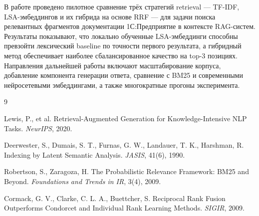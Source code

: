 \documentclass[nonacm, sigconf]{acmart}
\begin{document}
В работе проведено пилотное сравнение трёх стратегий retrieval — TF-IDF, LSA-эмбеддингов и их гибрида на основе RRF — для задачи поиска релевантных фрагментов документации 1С:Предприятие в контексте RAG-систем. Результаты показывают, что локально обученные LSA-эмбеддинги способны превзойти лексический baseline по точности первого результата, а гибридный метод обеспечивает наиболее сбалансированное качество на top-3 позициях. Направления дальнейшей работы включают масштабирование корпуса, добавление компонента генерации ответа, сравнение с BM25 и современными нейросетевыми эмбеддингами, а также многократные прогоны эксперимента.

\begin{thebibliography}{9}

Lewis, P., et al. Retrieval-Augmented Generation for Knowledge-Intensive NLP Tasks. \textit{NeurIPS}, 2020.

Deerwester, S., Dumais, S. T., Furnas, G. W., Landauer, T. K., Harshman, R. Indexing by Latent Semantic Analysis. \textit{JASIS}, 41(6), 1990.

Robertson, S., Zaragoza, H. The Probabilistic Relevance Framework: BM25 and Beyond. \textit{Foundations and Trends in IR}, 3(4), 2009.

Cormack, G. V., Clarke, C. L. A., Buettcher, S. Reciprocal Rank Fusion Outperforms Condorcet and Individual Rank Learning Methods. \textit{SIGIR}, 2009.

\end{thebibliography}
\end{document}
